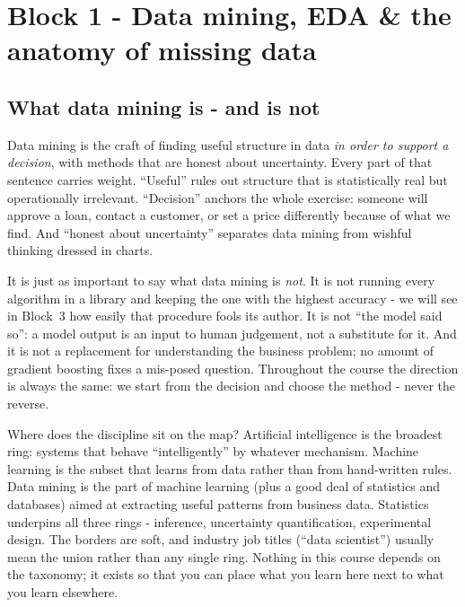 \documentclass[11pt,a4paper]{article}
\begin{document}
\section{Block 1 - Data mining, EDA \& the anatomy of missing data}

\subsection{What data mining is - and is not}
Data mining is the craft of finding useful structure in data \emph{in order
to support a decision}, with methods that are honest about uncertainty. Every
part of that sentence carries weight. ``Useful'' rules out structure that is
statistically real but operationally irrelevant. ``Decision'' anchors the
whole exercise: someone will approve a loan, contact a customer, or set a
price differently because of what we find. And ``honest about uncertainty''
separates data mining from wishful thinking dressed in charts.

It is just as important to say what data mining is \emph{not}. It is not
running every algorithm in a library and keeping the one with the highest
accuracy - we will see in Block~3 how easily that procedure fools its
author. It is not ``the model said so'': a model output is an input to human
judgement, not a substitute for it. And it is not a replacement for
understanding the business problem; no amount of gradient boosting fixes a
mis-posed question. Throughout the course the direction is always the same:
we start from the decision and choose the method - never the reverse.

Where does the discipline sit on the map? Artificial intelligence is the
broadest ring: systems that behave ``intelligently'' by whatever mechanism.
Machine learning is the subset that learns from data rather than from
hand-written rules. Data mining is the part of machine learning (plus a good
deal of statistics and databases) aimed at extracting useful patterns from
business data. Statistics underpins all three rings - inference,
uncertainty quantification, experimental design. The borders are soft, and
industry job titles (``data scientist'') usually mean the union rather than
any single ring. Nothing in this course depends on the taxonomy; it exists
so that you can place what you learn here next to what you learn elsewhere.
\end{document}
